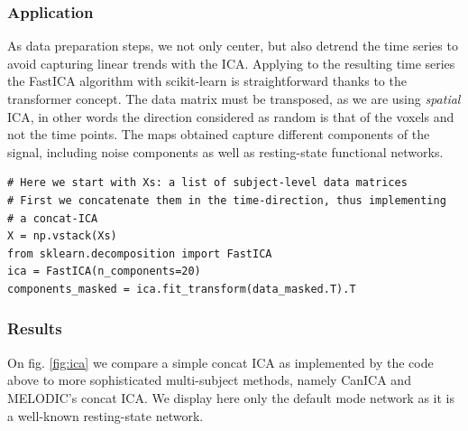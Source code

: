 \documentclass{frontiersSCNS} %
\begin{document}
\subsubsection{Application}

As data preparation steps, we not only center, but also detrend the time
series to avoid capturing linear trends with the ICA. Applying to the
resulting time series the FastICA algorithm with scikit-learn is
straightforward thanks to the transformer concept. The data matrix must
be transposed, as we are using \emph{spatial} ICA, in other words the
direction considered as random is that of the voxels and not the time
points. The maps obtained capture different components of the signal,
including noise components as well as resting-state functional networks.


\begin{lstlisting}
# Here we start with Xs: a list of subject-level data matrices
# First we concatenate them in the time-direction, thus implementing
# a concat-ICA
X = np.vstack(Xs)
from sklearn.decomposition import FastICA
ica = FastICA(n_components=20)
components_masked = ica.fit_transform(data_masked.T).T
\end{lstlisting}

\subsubsection{Results}

On fig. \ref{fig:ica} we compare a simple concat ICA as implemented by
the code above to more sophisticated multi-subject methods, namely CanICA
and MELODIC's concat ICA. We display here only the default mode network
as it is a well-known resting-state network.
\end{document}
